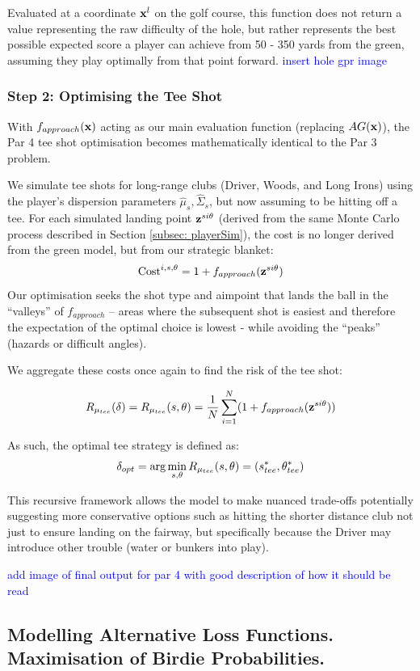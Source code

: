 \documentclass[11pt, letterpaper]{article}
\begin{document}
Evaluated at a coordinate $\mathbf{x}^l$ on the golf course, this function does not return a value representing the raw difficulty of the hole, but rather represents the best possible expected score a player can achieve from 50 - 350 yards from the green, assuming they play optimally from that point forward.
\textcolor{blue}{insert hole gpr image}

\subsubsection{Step 2: Optimising the Tee Shot}
With $f_{approach}(\mathbf{x})$ acting as our main evaluation function (replacing $AG(\mathbf{x})$), the Par 4 tee shot optimisation becomes mathematically identical to the Par 3 problem.

We simulate tee shots for long-range clubs (Driver, Woods, and Long Irons) using the player's dispersion parameters $\hat\mu_{s},\hat\Sigma_{s} $, but now assuming to be hitting off a tee. For each simulated landing point $\mathbf{z}^{si\theta}$ (derived from the same Monte Carlo process described in Section \ref{subsec: playerSim}), the cost is no longer derived from the green model, but from our strategic blanket:
$$\text{Cost}^{i, s, \theta} = 1 + f_{approach}(\mathbf{z}^{si\theta})$$
Our optimisation seeks the shot type and aimpoint that lands the ball in the ``valleys'' of $f_{approach}$ – areas where the subsequent shot is easiest and therefore the expectation of the optimal choice is lowest - while avoiding the ``peaks'' (hazards or difficult angles). 

We aggregate these costs once again to find the risk of the tee shot:

$$ R _{\mu_{tee}}(\delta)= R_{\mu_{tee}}(s, \theta) = \frac{1}{N} \sum^N_{i =1} (1 + f_{approach}(\mathbf{z}^{si\theta}))$$

As such, the optimal tee strategy is defined as:
$$\delta_{opt}  = \arg \min_{s, \theta} R_{\mu_{tee}}(s, \theta) =  (s^*_{tee}, \theta^*_{tee})$$

This recursive framework allows the model to make nuanced trade-offs potentially suggesting more conservative options such as hitting the shorter distance club not just to ensure landing on the fairway, but specifically because the Driver may introduce other trouble (water or bunkers into play).

\textcolor{blue}{add image of final output for par 4 with good description of how it should be read}

\subsection{Modelling Alternative Loss Functions. Maximisation of Birdie Probabilities.}
\label{subsec: par4b}
\end{document}
